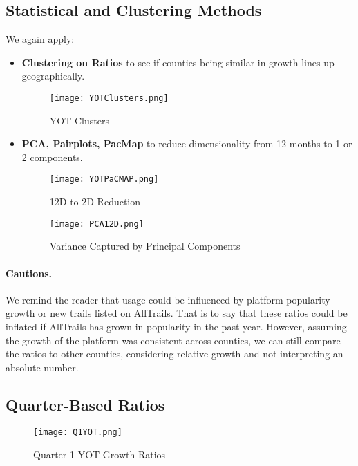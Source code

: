 \documentclass[12pt]{article}
\begin{document}
\subsection{Statistical and Clustering Methods}
We again apply:
\begin{itemize}
    \item \textbf{Clustering on Ratios} to see if counties being similar in growth lines up geographically.
    \begin{figure}[H]
        \centering
        \texttt{[image: YOTClusters.png]}
        \caption{YOT Clusters}
        \label{fig:enter-label}
    \end{figure}
    \item \textbf{PCA, Pairplots, PacMap} to reduce dimensionality from 12 months to 1 or 2 components.

    \begin{figure}[H]
        \centering
        \texttt{[image: YOTPaCMAP.png]}
        \caption{12D to 2D Reduction}
        \label{fig:enter-label}
    \end{figure}

    \begin{figure}[H]
        \centering
        \texttt{[image: PCA12D.png]}
        \caption{Variance Captured by Principal Components}
        \label{fig:enter-label}
    \end{figure}
\end{itemize}

\paragraph{Cautions.}
We remind the reader that usage could be influenced by platform popularity growth or new trails listed on AllTrails. That is to say that these ratios could be inflated if AllTrails has grown in popularity in the past year. However, assuming the growth of the platform was consistent across counties, we can still compare the ratios to other counties, considering relative growth and not interpreting an absolute number.

\subsection{Quarter-Based Ratios}

\begin{figure}[H]
    \centering
    \texttt{[image: Q1YOT.png]}
    \caption{Quarter 1 YOT Growth Ratios}
    \label{fig:enter-label}
\end{figure}
\end{document}
